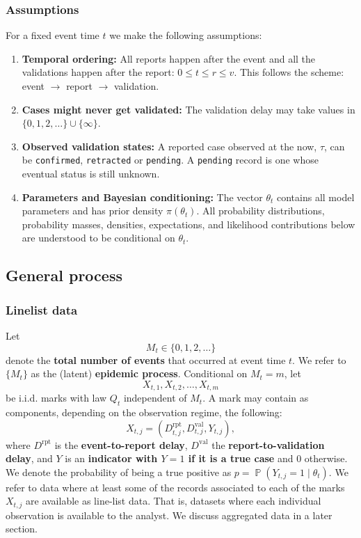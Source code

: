 \documentclass{article}
\theoremstyle{definition}
\theoremstyle{remark}
\newcommand{\Prb}{\operatorname{\mathbb{P}}}
\begin{document}
\subsubsection{Assumptions}
For a fixed event time $t$ we make the following assumptions:
\begin{enumerate}    
    \item \textbf{Temporal ordering:} 
    All reports happen after the event and all the validations happen after the report: $0 \leq t \leq r \leq v$. This follows the scheme: event $\to$ report $\to$ validation.   
    \item \textbf{Cases might never get validated:} The validation delay may take values in $\{0,1,2,\dots\} \cup \{\infty\}$.
    \item \textbf{Observed validation states:} A reported case observed at the now, $\tau$, can be \texttt{confirmed}, \texttt{retracted} or \texttt{pending}. A \texttt{pending} record is one whose eventual status is still unknown.
    \item \textbf{Parameters and Bayesian conditioning:} The vector $\theta_t$ contains all model parameters and has prior density $\pi(\theta_t)$. All probability distributions, probability masses, densities, expectations, and likelihood contributions below are understood to be conditional on $\theta_t$.
\end{enumerate}


\subsection{General process}

\subsubsection{Linelist data}
Let
\begin{equation}
    M_t \in \{0,1,2,\dots\}
\end{equation}
denote the \textbf{total number of events} that occurred at event time $t$. We refer to $\{M_t\}$ as the (latent) \textbf{epidemic process}. Conditional on $M_t = m$, let 
\begin{equation}
    X_{t,1}, X_{t,2}, \dots, X_{t,m}
\end{equation}
be i.i.d. marks with law $Q_t$ independent of $M_t$. A mark may contain as components, depending on the observation regime, the following:
\begin{equation}
X_{t,j} = (D^{\text{rpt}}_{t,j}, D^{\text{val}}_{t,j}, Y_{t,j}), 
\end{equation}
where $D^{\text{rpt}}$ is the \textbf{event-to-report delay}, $D^{\text{val}}$ the \textbf{report-to-validation delay}, and $Y$ is an \textbf{indicator with $Y = 1$ if it is a true case} and $0$ otherwise. We denote the probability of being a true positive as $p = \Prb(Y_{t,j} = 1\mid\theta_t)$. We refer to data where at least some of the records associated to each of the marks $X_{t,j}$ are available as line-list data. That is, datasets where each individual observation is available to the analyst. We discuss aggregated data in a later section.
\end{document}
